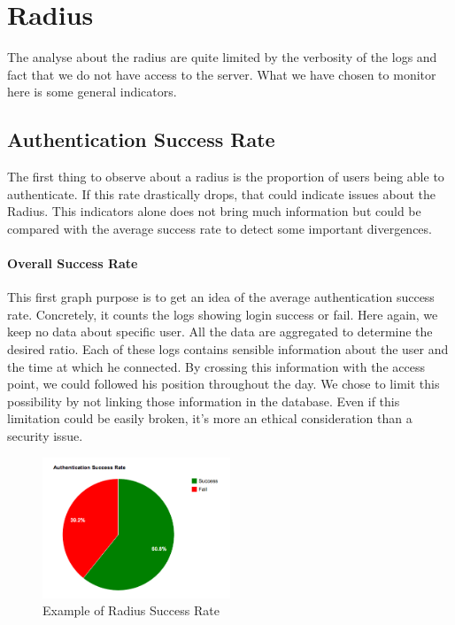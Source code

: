 \section{Radius}
The analyse about the radius are quite limited by the verbosity of the logs and fact that we do not have access to the server. What we have chosen to monitor here is some general indicators.

\subsection{Authentication Success Rate}
The first thing to observe about a radius is the proportion of users being able to authenticate. If this rate drastically drops, that could indicate issues about the Radius. This indicators alone does not bring much information but could be compared with the average success rate to detect some important divergences.

\paragraph*{Overall Success Rate} This first graph purpose is to get an idea of the average authentication success rate. Concretely, it counts the logs showing login success or fail. Here again, we keep no data about specific user. All the data are aggregated to determine the desired ratio. Each of these logs contains sensible information about the user and the time at which he connected. By crossing this information with the access point, we could followed his position throughout the day. We chose to limit this possibility by not linking those information in the database. Even if this limitation could be easily broken, it's more an ethical consideration than a security issue.

\begin{figure}[H]
	\centering
   \includegraphics[width=0.5\textwidth]{Pictures/chapter5/radiusRate.png}
   \caption{Example of Radius Success Rate}
\end{figure} 

